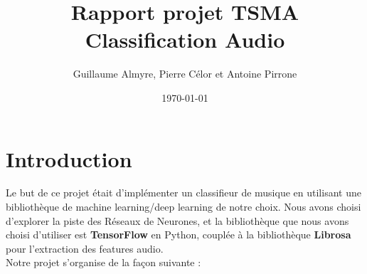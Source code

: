 \documentclass{article}
\begin{document}
\title{\textbf{Rapport projet TSMA \\
Classification Audio}}
\author{Guillaume Almyre, Pierre Célor et Antoine Pirrone}



\date{\today}
\posttitle{\end{center}}
\maketitle

\newpage

\section*{Introduction}

Le but de ce projet était d'implémenter un classifieur de musique en utilisant une bibliothèque de machine learning/deep learning de notre choix. Nous avons choisi d'explorer la piste des Réseaux de Neurones, et la bibliothèque que nous avons choisi d'utiliser est \textbf{TensorFlow} en Python, couplée à la bibliothèque \textbf{Librosa} pour l'extraction des features audio.\\

Notre projet s'organise de la façon suivante :
\end{document}
